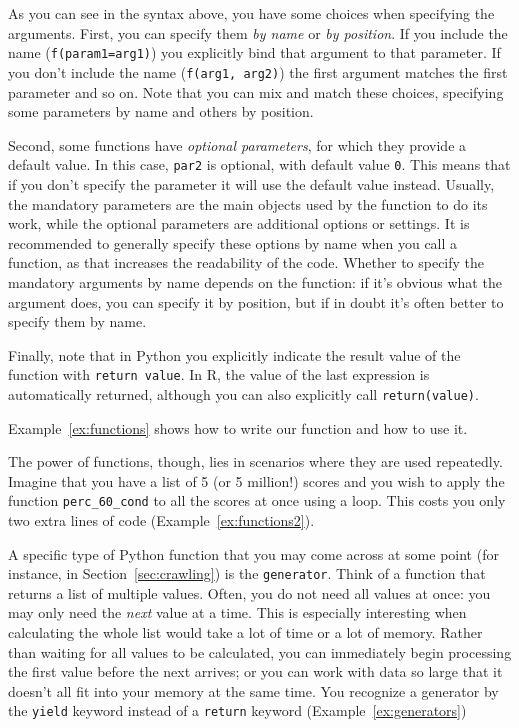 As you can see in the syntax above, you have some choices when specifying the arguments.
First, you can specify them \emph{by name} or \emph{by position}.
If you include the name (\verb|f(param1=arg1)|) you explicitly bind that argument to that parameter.
If you don't include the name (\verb|f(arg1, arg2)|) the first argument matches the first parameter and so on.
Note that you can mix and match these choices, specifying some parameters by name and others by position.

Second, some functions have \emph{optional parameters}, for which they provide a default value.
In this case, \verb|par2| is optional, with default value \verb|0|.
This means that if you don't specify the parameter it will use the default value instead.
Usually, the mandatory parameters are the main objects used by the function to do its work,
while the optional parameters are additional options or settings.
It is recommended to generally specify these options by name when you call a function,
as that increases the readability of the code.
Whether to specify the mandatory arguments by name depends on the function:
if it's obvious what the argument does, you can specify it by position,
but if in doubt it's often better to specify them by name. 

Finally, note that in Python you explicitly indicate the result value of the function with
\verb|return value|.
In R, the value of the last expression is automatically returned,
although you can also explicitly call \verb|return(value)|. 

Example~\ref{ex:functions} shows how to write our function and how to use it.

The power of functions, though, lies in scenarios where they are used
repeatedly.  Imagine that you have a list of 5 (or 5 million!) scores
and you wish to apply the function \verb|perc_60_cond| to all the scores at
once using a loop. This costs you only two extra lines of code
(Example~\ref{ex:functions2}).



\begin{feature}
  A specific type of Python function that you may come across at some point (for instance, in Section~\ref{sec:crawling}) is the \texttt{generator}. 
  Think of a function that returns a list of multiple values. Often, you do not need all values at once: you may only 
  need the \emph{next} value at a time. This is especially interesting when calculating the whole list would take a lot of time or a lot 
  of memory. Rather than waiting for all values to be calculated, you can immediately begin processing the first value before the next arrives; or 
  you can work with data so large that it doesn't all fit into your memory at the same time.  You recognize a generator by 
  the \verb|yield| keyword instead of a \verb|return| keyword (Example~\ref{ex:generators})
\end{feature}

